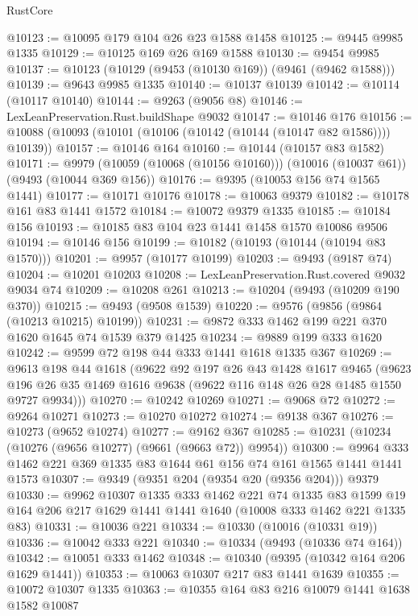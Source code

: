 \begin{lexlean}{RustCore}
\begin{coremodule}
@10123 := @10095 @179 @104 @26 @23 @1588 @1458
@10125 := @9445 @9985 @1335
@10129 := @10125 @169 @26 @169 @1588
@10130 := @9454 @9985
@10137 := @10123 (@10129 (@9453 (@10130 @169)) (@9461 (@9462 @1588)))
@10139 := @9643 @9985 @1335
@10140 := @10137 @10139
@10142 := @10114 (@10117 @10140)
@10144 := @9263 (@9056 @8)
@10146 := LexLeanPreservation.Rust.buildShape @9032
@10147 := @10146 @176
@10156 := @10088 (@10093 (@10101 (@10106 (@10142 (@10144 (@10147 @82 @1586)))) @10139))
@10157 := @10146 @164
@10160 := @10144 (@10157 @83 @1582)
@10171 := @9979 (@10059 (@10068 (@10156 @10160))) (@10016 (@10037 @61)) (@9493 (@10044 @369 @156))
@10176 := @9395 (@10053 @156 @74 @1565 @1441)
@10177 := @10171 @10176
@10178 := @10063 @9379
@10182 := @10178 @161 @83 @1441 @1572
@10184 := @10072 @9379 @1335
@10185 := @10184 @156
@10193 := @10185 @83 @104 @23 @1441 @1458 @1570 @10086 @9506
@10194 := @10146 @156
@10199 := @10182 (@10193 (@10144 (@10194 @83 @1570)))
@10201 := @9957 (@10177 @10199)
@10203 := @9493 (@9187 @74)
@10204 := @10201 @10203
@10208 := LexLeanPreservation.Rust.covered @9032 @9034 @74
@10209 := @10208 @261
@10213 := @10204 (@9493 (@10209 @190 @370))
@10215 := @9493 (@9508 @1539)
@10220 := @9576 (@9856 (@9864 (@10213 @10215) @10199))
@10231 := @9872 @333 @1462 @199 @221 @370 @1620 @1645 @74 @1539 @379 @1425
@10234 := @9889 @199 @333 @1620
@10242 := @9599 @72 @198 @44 @333 @1441 @1618 @1335 @367
@10269 := @9613
    @198
    @44
    @1618
    (@9622
      @92
      @197
      @26
      @43
      @1428
      @1617
      @9465
      (@9623 @196 @26 @35 @1469 @1616 @9638 (@9622 @116 @148 @26 @28 @1485 @1550 @9727 @9934)))
@10270 := @10242 @10269
@10271 := @9068 @72
@10272 := @9264 @10271
@10273 := @10270 @10272
@10274 := @9138 @367
@10276 := @10273 (@9652 @10274)
@10277 := @9162 @367
@10285 := @10231 (@10234 (@10276 (@9656 @10277) (@9661 (@9663 @72)) @9954))
@10300 := @9964 @333 @1462 @221 @369 @1335 @83 @1644 @61 @156 @74 @161 @1565 @1441 @1441 @1573
@10307 := @9349 (@9351 @204 (@9354 @20 (@9356 @204))) @9379
@10330 := @9962
    @10307
    @1335
    @333
    @1462
    @221
    @74
    @1335
    @83
    @1599
    @19
    @164
    @206
    @217
    @1629
    @1441
    @1441
    @1640
    (@10008 @333 @1462 @221 @1335 @83)
@10331 := @10036 @221
@10334 := @10330 (@10016 (@10331 @19))
@10336 := @10042 @333 @221
@10340 := @10334 (@9493 (@10336 @74 @164))
@10342 := @10051 @333 @1462
@10348 := @10340 (@9395 (@10342 @164 @206 @1629 @1441))
@10353 := @10063 @10307 @217 @83 @1441 @1639
@10355 := @10072 @10307 @1335
@10363 := @10355 @164 @83 @216 @10079 @1441 @1638 @1582 @10087

\end{coremodule}
\end{lexlean}
